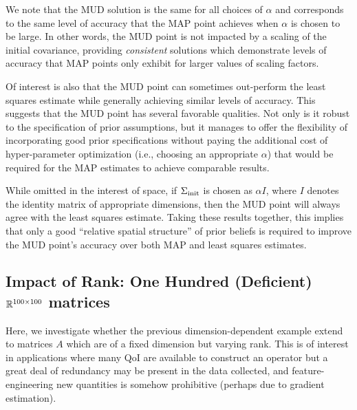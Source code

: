 We note that the MUD solution is the same for all choices of $\alpha$ and corresponds to the same level of accuracy that the MAP point achieves when $\alpha$ is chosen to be large.
In other words, the MUD point is not impacted by a scaling of the initial covariance, providing \emph{consistent} solutions which demonstrate levels of accuracy that MAP points only exhibit for larger values of scaling factors.

Of interest is also that the MUD point can sometimes out-perform the least squares estimate while generally achieving similar levels of accuracy.
This suggests that the MUD point has several favorable qualities.
Not only is it robust to the specification of prior assumptions, but it manages to offer the flexibility of incorporating good prior specifications without paying the additional cost of hyper-parameter optimization (i.e., choosing an appropriate $\alpha$) that would be required for the MAP estimates to achieve comparable results.

While omitted in the interest of space, if $\Sigma_\text{init}$ is chosen as $\alpha I$, where $I$ denotes the identity matrix of appropriate dimensions, then the MUD point will always agree with the least squares estimate.
Taking these results together, this implies that only a good ``relative spatial structure'' of prior beliefs is required to improve the MUD point's accuracy over both MAP and least squares estimates.


\subsection{Impact of Rank: One Hundred (Deficient) $\mathbb{R}^{100 \times 100}$ matrices}

Here, we investigate whether the previous dimension-dependent example extend to matrices $A$ which are of a fixed dimension but varying rank.
This is of interest in applications where many QoI are available to construct an operator but a great deal of redundancy may be present in the data collected, and feature-engineering new quantities is somehow prohibitive (perhaps due to gradient estimation).


